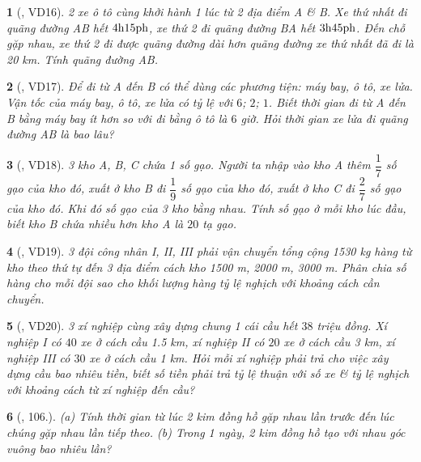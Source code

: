\documentclass{article}
\newtheorem{baitoan}{}
\begin{document}
\begin{baitoan}[\cite{Binh_Toan_7_tap_1}, VD16]
	2 xe ô tô cùng khởi hành 1 lúc từ 2 địa điểm A \& B. Xe thứ nhất đi quãng đường AB hết $\rm4h15ph$, xe thứ 2 đi quãng đường BA hết $\rm3h45ph$. Đến chỗ gặp nhau, xe thứ 2 đi được quãng đường dài hơn quãng đường xe thứ nhất đã đi là {\rm20 km}. Tính quãng đường AB.
\end{baitoan}

\begin{baitoan}[\cite{Binh_Toan_7_tap_1}, VD17]
	Để đi từ A đến B có thể dùng các phương tiện: máy bay, ô tô, xe lửa. Vận tốc của máy bay, ô tô, xe lửa có tỷ lệ với $6$; $2$; $1$. Biết thời gian đi từ A đến B bằng máy bay ít hơn so với đi bằng ô tô là $6$ giờ. Hỏi thời gian xe lửa đi quãng đường AB là bao lâu?
\end{baitoan}

\begin{baitoan}[\cite{Binh_Toan_7_tap_1}, VD18]
	3 kho A, B, C chứa 1 số gạo. Người ta nhập vào kho A thêm $\dfrac{1}{7}$ số gạo của kho đó, xuất ở kho B đi $\dfrac{1}{9}$ số gạo của kho đó, xuất ở kho C đi $\dfrac{2}{7}$ số gạo của kho đó. Khi đó số gạo của 3 kho bằng nhau. Tính số gạo ở mỗi kho lúc đầu, biết kho B chứa nhiều hơn kho A là $20$ tạ gạo.
\end{baitoan}

\begin{baitoan}[\cite{Binh_Toan_7_tap_1}, VD19]
	3 đội công nhân I, II, III phải vận chuyển tổng cộng {\rm1530 kg} hàng từ kho theo thứ tự đến 3 địa điểm cách kho {\rm1500 m, 2000 m, 3000 m}. Phân chia số hàng cho mỗi đội sao cho khối lượng hàng tỷ lệ nghịch với khoảng cách cần chuyển.
\end{baitoan}

\begin{baitoan}[\cite{Binh_Toan_7_tap_1}, VD20]
	3 xí nghiệp cùng xây dựng chung 1 cái cầu hết $38$ triệu đồng. Xí nghiệp I có $40$ xe ở cách cầu {\rm1.5 km}, xí nghiệp II có $20$ xe ở cách cầu {\rm3 km}, xí nghiệp III có $30$ xe ở cách cầu {\rm1 km}. Hỏi mỗi xí nghiệp phải trả cho việc xây dựng cầu bao nhiêu tiền, biết số tiền phải trả tỷ lệ thuận với số xe \& tỷ lệ nghịch với khoảng cách từ xí nghiệp đến cầu?
\end{baitoan}

\begin{baitoan}[\cite{Binh_Toan_7_tap_1}, 106.]
	
	(a) Tính thời gian từ lúc 2 kim đồng hồ gặp nhau lần trước đến lúc chúng gặp nhau lần tiếp theo.
	(b) Trong 1 ngày, 2 kim đồng hồ tạo với nhau góc vuông bao nhiêu lần?
	
\end{baitoan}
\end{document}
